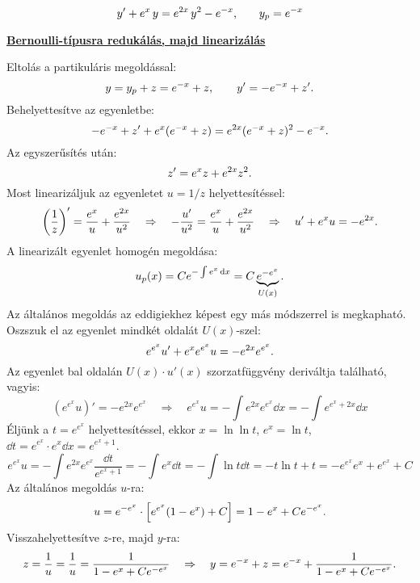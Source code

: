 \clearpage
\begin{example}
  $$
    y' + e^x \, y = e^{2x} \, y^2 - e^{-x}
    \text,\qquad
    y_p = e^{-x}
  $$

  \boxrule

  \underline{\textbf{Bernoulli-típusra redukálás, majd linearizálás}}

  Eltolás a partikuláris megoldással:
  $$
    y = y_p + z = e^{-x} + z,
    \qquad
    y' = -e^{-x} + z'
    \text.
  $$
  Behelyettesítve az egyenletbe:
  $$
    -e^{-x} + z' + e^x(e^{-x} + z) = e^{2x}(e^{-x} + z)^2 - e^{-x}
    \text.
  $$
  Az egyszerűsítés után:
  $$
    z' = e^x z + e^{2x} z^2
    \text.
  $$
  Most linearizáljuk az egyenletet $u = 1 / z$ helyettesítéssel:
  $$
    \left(\frac1z\right)' = \frac{e^x}{u} + \frac{e^{2x}}{u^2}
    \quad\Rightarrow\quad
    -\frac{u'}{u^2} = \frac{e^x}{u} + \frac{e^{2x}}{u^2}
    \quad\Rightarrow\quad
    u' + e^x u = - e^{2x}
    \text.
  $$
  A linearizált egyenlet homogén megoldása:
  $$
    u_p(x)
    = C e^{-\int e^x \mathop{}\!\mathrm{d} x}
    = C \underbrace{e^{-e^x}}_{U(x)}
    \text.
  $$
  Az általános megoldás az eddigiekhez képest egy más módszerrel is megkapható.
  Osz\-szuk el az egyenlet mindkét oldalát $U(x)$-szel:
  $$
    e^{e^x} u' + e^x e^{e^x} u = -e^{2x} e^{e^x}
    \text.
  $$
  Az egyenlet bal oldalán $U(x) \cdot u'(x)$ szorzatfüggvény deriváltja
  található, vagyis:
  $$
    \left(e^{e^x} u\right)' = -e^{2x} e^{e^x}
    \quad\Rightarrow\quad
    e^{e^x} u
    = -\int e^{2x} e^{e^x} \dd x
    = -\int e^{e^x + 2x} \dd x
  $$
  Éljünk a $t = e^{e^x}$ helyettesítéssel, ekkor $x = \ln \ln t$, $e^x = \ln t$,
  $\dd t = e^{e^x} \cdot e^x \dd x = e^{e^x + 1}$.
  $$
    e^{e^x} u
    = -\int e^{2x} e^{e^x} \frac{\dd t}{e^{e^x + 1}}
    = -\int e^x \dd t
    = -\int \ln t \dd t
    = -t \ln t + t
    = -e^{e^x} e^x + e^{e^x} + C
  $$
  Az általános megoldás $u$-ra:
  $$
    u = e^{-e^x} \cdot \left[e^{e^x}(1 - e^x) + C\right]
    = 1 - e^x + C e^{-e^x}
    \text.
  $$
  Visszahelyettesítve $z$-re, majd $y$-ra:
  $$
    z = \frac1u
    = \frac{1}{u} = \frac{1}{1 - e^x + C e^{-e^x}}
    \quad\Rightarrow\quad
    y = e^{-x} + z
    = e^{-x} + \frac{1}{1 - e^x + C e^{-e^x}}
    \text.
  $$
\end{example}